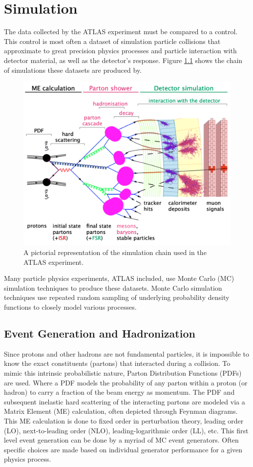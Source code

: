 \chapter{Simulation}\label{chap:sim}
	The data collected by the ATLAS experiment must be compared to a control. This control is most often a dataset of simulation particle collisions that approximate to great precision physics processes and particle interaction with detector material, as well as the detector's response. Figure \ref{fig:simulation} shows the chain of simulations these datasets are produced by. 
	\begin{figure}[!ht]
	\centering
	\includegraphics[width=.95\textwidth,keepaspectratio=true]{chapters/chapter4_simulation/images/Simulation_Chain.png}
	\caption{\label{fig:simulation} A pictorial representation of the simulation chain used in the ATLAS experiment. \cite{Wanotayaroj:2242196}}
	\end{figure}
	
	Many particle physics experiments, ATLAS included, use Monte Carlo (MC) simulation techniques to produce these datasets. Monte Carlo simulation techniques use repeated random sampling of underlying probability density functions to closely model various processes. 

	\section{Event Generation and Hadronization}\label{sec:event-gen}
	Since protons and other hadrons are not fundamental particles, it is impossible to know the exact constituents (partons) that interacted during a collision. To mimic this intrinsic probabilistic nature, Parton Distribution Functions (PDFs) are used. Where a PDF models the probability of any parton within a proton (or hadron) to carry a fraction of the beam energy as momentum. The PDF and subsequent inelastic hard scattering of the interacting partons are modeled via a Matrix Element (ME) calculation, often depicted through Feynman diagrams. This ME calculation is done to fixed order in perturbation theory, leading order (LO), next-to-leading order (NLO), leading-logarithmic order (LL), etc. This first level event generation can be done by a myriad of MC event generators. Often specific choices are made based on individual generator performance for a given physics process.

